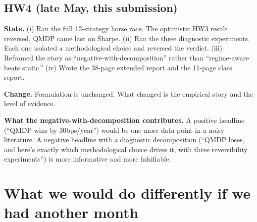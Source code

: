 \documentclass[11pt]{article}
\begin{document}
\subsection{HW4 (late May, this submission)}

\textbf{State.} (i) Ran the full 12-strategy horse race. The optimistic HW3 result reversed, QMDP came last on Sharpe. (ii) Ran the three diagnostic experiments. Each one isolated a methodological choice and reversed the verdict. (iii) Reframed the story as ``negative-with-decomposition'' rather than ``regime-aware beats static.'' (iv) Wrote the 38-page extended report and the 11-page class report.

\textbf{Change.} Formulation is unchanged. What changed is the empirical story and the level of evidence.

\textbf{What the negative-with-decomposition contributes.} A positive headline (``QMDP wins by 30bps/year'') would be one more data point in a noisy literature. A negative headline with a diagnostic decomposition (``QMDP loses, and here's exactly which methodological choice drives it, with three reversibility experiments'') is more informative and more falsifiable.

\section{What we would do differently if we had another month}
\end{document}

